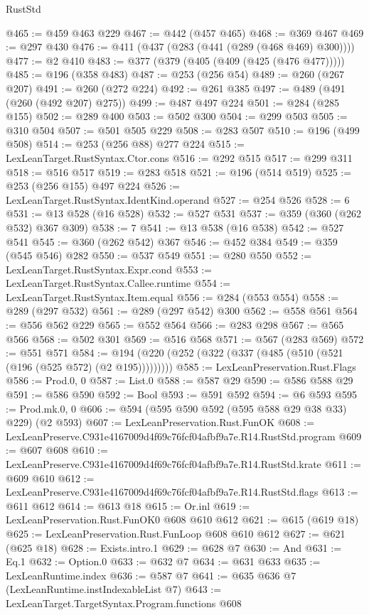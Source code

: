 \begin{lexlean}{RustStd}
\begin{coremodule}
@465 := @459 @463 @229
@467 := @442 (@457 @465)
@468 := @369 @467
@469 := @297 @430
@476 := @411 (@437 (@283 (@441 (@289 (@468 @469) @300))))
@477 := @2 @410
@483 := @377 (@379 (@405 (@409 (@425 (@476 @477)))))
@485 := @196 (@358 @483)
@487 := @253 (@256 @54)
@489 := @260 (@267 @207)
@491 := @260 (@272 @224)
@492 := @261 @385
@497 := @489 (@491 (@260 (@492 @207) @275))
@499 := @487 @497 @224
@501 := @284 (@285 @155)
@502 := @289 @400
@503 := @502 @300
@504 := @299 @503
@505 := @310 @504
@507 := @501 @505 @229
@508 := @283 @507
@510 := @196 (@499 @508)
@514 := @253 (@256 @88) @277 @224
@515 := LexLeanTarget.RustSyntax.Ctor.cons
@516 := @292 @515
@517 := @299 @311
@518 := @516 @517
@519 := @283 @518
@521 := @196 (@514 @519)
@525 := @253 (@256 @155) @497 @224
@526 := LexLeanTarget.RustSyntax.IdentKind.operand
@527 := @254 @526
@528 := 6
@531 := @13 @528 (@16 @528)
@532 := @527 @531
@537 := @359 (@360 (@262 @532) @367 @309)
@538 := 7
@541 := @13 @538 (@16 @538)
@542 := @527 @541
@545 := @360 (@262 @542) @367
@546 := @452 @384
@549 := @359 (@545 @546) @282
@550 := @537 @549
@551 := @280 @550
@552 := LexLeanTarget.RustSyntax.Expr.cond
@553 := LexLeanTarget.RustSyntax.Callee.runtime
@554 := LexLeanTarget.RustSyntax.Item.equal
@556 := @284 (@553 @554)
@558 := @289 (@297 @532)
@561 := @289 (@297 @542) @300
@562 := @558 @561
@564 := @556 @562 @229
@565 := @552 @564
@566 := @283 @298
@567 := @565 @566
@568 := @502 @301
@569 := @516 @568
@571 := @567 (@283 @569)
@572 := @551 @571
@584 := @194 (@220 (@252 (@322 (@337 (@485 (@510 (@521 (@196 (@525 @572) (@2 @195)))))))))
@585 := LexLeanPreservation.Rust.Flags
@586 := Prod.{0, 0}
@587 := List.{0}
@588 := @587 @29
@590 := @586 @588 @29
@591 := @586 @590
@592 := Bool
@593 := @591 @592
@594 := @6 @593
@595 := Prod.mk.{0, 0}
@606 := @594 (@595 @590 @592 (@595 @588 @29 @38 @33) @229) (@2 @593)
@607 := LexLeanPreservation.Rust.FunOK
@608 := LexLeanPreserve.C931e4167009d4f69c76fcf04afbf9a7e.R14.RustStd.program
@609 := @607 @608
@610 := LexLeanPreserve.C931e4167009d4f69c76fcf04afbf9a7e.R14.RustStd.krate
@611 := @609 @610
@612 := LexLeanPreserve.C931e4167009d4f69c76fcf04afbf9a7e.R14.RustStd.flags
@613 := @611 @612
@614 := @613 @18
@615 := Or.inl
@619 := LexLeanPreservation.Rust.FunOK0 @608 @610 @612
@621 := @615 (@619 @18)
@625 := LexLeanPreservation.Rust.FunLoop @608 @610 @612
@627 := @621 (@625 @18)
@628 := Exists.intro.{1}
@629 := @628 @7
@630 := And
@631 := Eq.{1}
@632 := Option.{0}
@633 := @632 @7
@634 := @631 @633
@635 := LexLeanRuntime.index
@636 := @587 @7
@641 := @635 @636 @7 (LexLeanRuntime.instIndexableList @7)
@643 := LexLeanTarget.TargetSyntax.Program.functions @608

\end{coremodule}
\end{lexlean}
